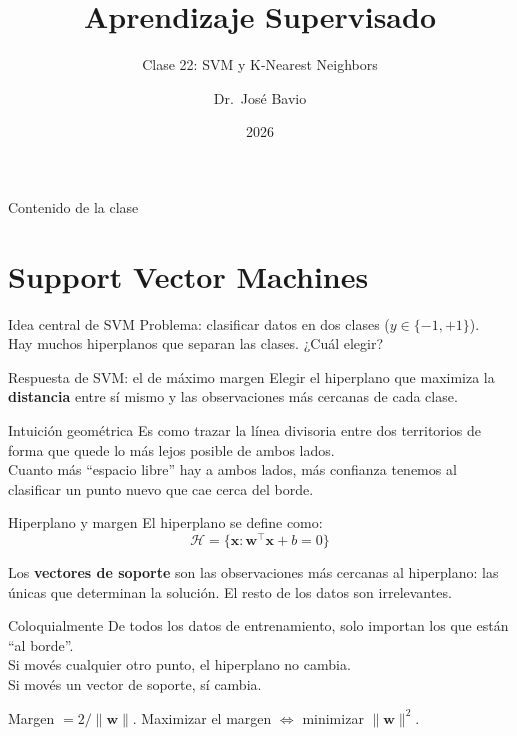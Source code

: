 \documentclass[aspectratio=169]{beamer}
\title[MAD1 -- Unidad 4]{Aprendizaje Supervisado}
\subtitle{Clase 22: SVM y K-Nearest Neighbors}
\author[J. Bavio]{Dr.\ José Bavio}
\institute[UNS]{Departamento de Matemática\\Universidad Nacional del Sur}
\date{2026}
\newcommand{\bx}{\bm{x}}
\newcommand{\bw}{\bm{w}}
\begin{document}
\begin{frame}
  \titlepage
\end{frame}

\begin{frame}{Contenido de la clase}
  \tableofcontents
\end{frame}

\section{Support Vector Machines}

\begin{frame}{Idea central de SVM}
  Problema: clasificar datos en dos clases ($y \in \{-1, +1\}$).\\
  Hay muchos hiperplanos que separan las clases. ¿Cuál elegir?

  \medskip
  \begin{block}{Respuesta de SVM: el de máximo margen}
    Elegir el hiperplano que maximiza la \textbf{distancia} entre sí mismo
    y las observaciones más cercanas de cada clase.
  \end{block}

  \medskip
  \begin{exampleblock}{Intuición geométrica}
    Es como trazar la línea divisoria entre dos territorios
    de forma que quede lo más lejos posible de ambos lados.\\
    Cuanto más ``espacio libre'' hay a ambos lados, más confianza tenemos
    al clasificar un punto nuevo que cae cerca del borde.
  \end{exampleblock}
\end{frame}

\begin{frame}{Hiperplano y margen}
  El hiperplano se define como:
  \[
    \mathcal{H} = \{\bx : \bw^\top \bx + b = 0\}
  \]

  Los \textbf{vectores de soporte} son las observaciones más cercanas al hiperplano:
  las únicas que determinan la solución. El resto de los datos son irrelevantes.

  \medskip
  \begin{exampleblock}{Coloquialmente}
    De todos los datos de entrenamiento, solo importan los que están ``al borde''.\\
    Si movés cualquier otro punto, el hiperplano no cambia.\\
    Si movés un vector de soporte, sí cambia.
  \end{exampleblock}

  \medskip
  Margen $= 2/\|\bw\|$. Maximizar el margen $\Leftrightarrow$ minimizar $\|\bw\|^2$.
\end{frame}
\end{document}
